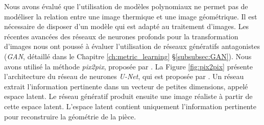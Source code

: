 Nous avons évalué que l'utilisation de modèles polynomiaux ne permet pas de modéliser la relation entre une image thermique et une image géométrique.
Il est nécessaire de disposer d'un modèle qui est adapté au traitement d'images.
Les récentes avancées des réseaux de neurones profonds pour la transformation d'images nous ont poussé à évaluer l'utilisation de réseaux génératifs antagonistes (\textit{GAN}, détaillé dans le Chapitre \ref{ch:metric_learning} §\ref{subsubsec:GAN}).
Nous avons utilisé la méthode \textit{pix2pix}, proposée par \citeauthor{zhu_unpaired_2017} \cite{zhu_unpaired_2017}.
La Figure \ref{fig:pix2pix} présente l'architecture du réseau de neurones \textit{U-Net}, qui est proposée par \citeauthor{ronneberger_unet_2015} \cite{ronneberger_unet_2015}.
Un réseau extrait l'information pertinente dans un vecteur de petites dimensions, appelé espace latent.
Le réseau génératif produit ensuite une image réaliste à partir de cette espace latent.
L'espace latent contient uniquement l'information pertinente pour reconstruire la géométrie de la pièce.

